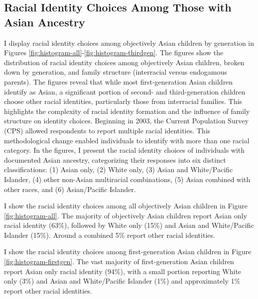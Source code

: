 \subsection{Racial Identity Choices Among Those with Asian Ancestry}
I display racial identity choices among objectively Asian children by generation in Figures \ref{fig:histogram-all}-\ref{fig:histogram-thirdgen}. The figures show the distribution of racial identity choices among objectively Asian children, broken down by generation, and family structure (interracial versus endogamous parents). The figures reveal that while most first-generation Asian children identify as Asian, a significant portion of second- and third-generation children choose other racial identities, particularly those from interracial families. This highlights the complexity of racial identity formation and the influence of family structure on identity choices. Beginning in 2003, the Current Population Survey (CPS) allowed respondents to report multiple racial identities. This methodological change enabled individuals to identify with more than one racial category. In the figures, I present the racial identity choices of individuals with documented Asian ancestry, categorizing their responses into six distinct classifications: (1) Asian only, (2) White only, (3) Asian and White/Pacific Islander, (4) other non-Asian multiracial combinations, (5) Asian combined with other races, and (6) Asian/Pacific Islander.


I show the racial identity choices among all objectively Asian children in Figure \ref{fig:histogram-all}. The majority of objectively Asian children report Asian only racial identity (63\%), followed by White only (15\%) and Asian and White/Pacific Islander (15\%). Around a combined 5\% report other racial identities. 

I show the racial identity choices among first-generation Asian children in Figure \ref{fig:histogram-firstgen}. The vast majority of first-generation Asian children report Asian only racial identity (94\%), with a small portion reporting White only (3\%) and Asian and White/Pacific Islander (1\%) and approximately 1\% report other racial identities.

